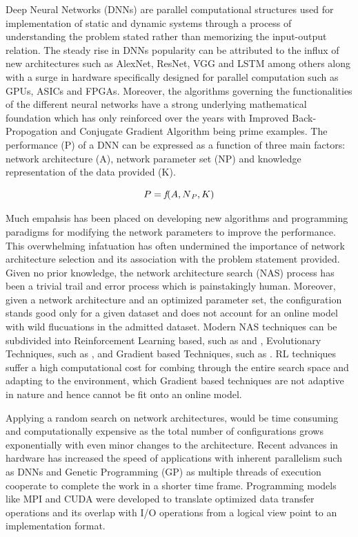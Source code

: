 \documentclass[conference]{IEEEtran}
\begin{document}
Deep Neural Networks (DNNs) are parallel computational structures used for implementation of static and dynamic systems through a process of understanding the problem stated rather than memorizing the input-output relation.    
The steady rise in DNNs popularity can be attributed to the influx of new architectures such as AlexNet\cite{AlexNet}, ResNet\cite{ResNet}, VGG\cite{VGG} and LSTM\cite{LSTM} among others along with a surge in hardware specifically designed for parallel computation such as GPUs, ASICs and FPGAs. Moreover, the algorithms governing the functionalities of the different neural networks have a strong underlying mathematical foundation which has only reinforced over the years with Improved Back-Propogation \cite{IBP} and Conjugate Gradient Algorithm \cite{CGA} being prime examples. The performance (P) of a DNN can be expressed as a function of three main factors: network architecture (A), network parameter set (NP) and knowledge representation of the data provided (K).

\begin{equation}
P = \textit{f}(A, N\textsubscript{\textit{P}}, K) \label{performance}
\end{equation}

Much empahsis has been placed on developing new algorithms and programming paradigms for modifying the network parameters to improve the performance. This overwhelming infatuation has often undermined the importance of network architecture selection and its association with the problem statement provided. Given no prior knowledge, the network architecture search (NAS) process has been a trivial trail and error process which is painstakingly human. Moreover, given a network architecture and an optimized parameter set, the configuration stands good only for a given dataset and does not account for an online model with wild flucuations in the admitted dataset. Modern NAS techniques can be subdivided into Reinforcement Learning based, such as \cite{RLNAS1} and \cite{RLNAS2}, Evolutionary Techniques, such as \cite{ENAS}, and Gradient based Techniques, such as \cite{GNAS}. RL techniques suffer a high computational cost for combing through the entire search space and adapting to the environment, which Gradient based techniques are not adaptive in nature and hence cannot be fit onto an online model.  

Applying a random search on network architectures, would be time consuming and computationally expensive as the total number of configurations grows exponentially with even minor changes to the architecture. Recent advances in hardware has increased the speed of applications with inherent parallelism such as DNNs and Genetic Programming (GP) as multiple threads of execution cooperate to complete the work in a shorter time frame. Programming models like MPI and CUDA were developed to translate optimized data transfer operations and its overlap with I/O operations from a logical view point to an implementation format.
\end{document}
